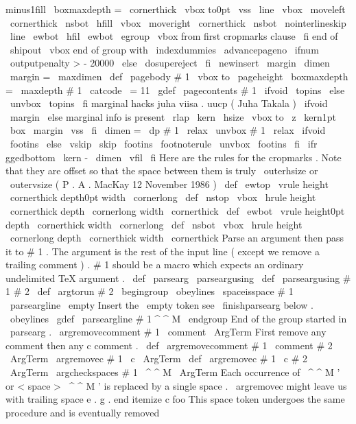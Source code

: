 {{{{minus1fill
\
boxmaxdepth
=
\
cornerthick
\
vbox
to0pt
{
\
vss
\
line
{
%
\
vbox
{
\
moveleft
\
cornerthick
\
nsbot
}
%
\
hfill
\
vbox
{
\
moveright
\
cornerthick
\
nsbot
}
%
}
%
\
nointerlineskip
\
line
{
\
ewbot
\
hfil
\
ewbot
}
%
}
%
\
egroup
%
\
vbox
from
first
cropmarks
clause
\
fi
}
%
end
of
\
shipout
\
vbox
}
%
end
of
group
with
\
indexdummies
\
advancepageno
\
ifnum
\
outputpenalty
>
-
20000
\
else
\
dosupereject
\
fi
}
\
newinsert
\
margin
\
dimen
\
margin
=
\
maxdimen
\
def
\
pagebody
#
1
{
\
vbox
to
\
pageheight
{
\
boxmaxdepth
=
\
maxdepth
#
1
}
}
{
\
catcode
\
=
11
\
gdef
\
pagecontents
#
1
{
\
ifvoid
\
topins
\
else
\
unvbox
\
topins
\
fi
%
marginal
hacks
juha
viisa
.
uucp
(
Juha
Takala
)
\
ifvoid
\
margin
\
else
%
marginal
info
is
present
\
rlap
{
\
kern
\
hsize
\
vbox
to
\
z
{
\
kern1pt
\
box
\
margin
\
vss
}
}
\
fi
\
dimen
=
\
dp
#
1
\
relax
\
unvbox
#
1
\
relax
\
ifvoid
\
footins
\
else
\
vskip
\
skip
\
footins
\
footnoterule
\
unvbox
\
footins
\
fi
\
ifr
ggedbottom
\
kern
-
\
dimen
\
vfil
\
fi
}
}
%
Here
are
the
rules
for
the
cropmarks
.
Note
that
they
are
%
offset
so
that
the
space
between
them
is
truly
\
outerhsize
or
\
outervsize
%
(
P
.
A
.
MacKay
12
November
1986
)
%
\
def
\
ewtop
{
\
vrule
height
\
cornerthick
depth0pt
width
\
cornerlong
}
\
def
\
nstop
{
\
vbox
{
\
hrule
height
\
cornerthick
depth
\
cornerlong
width
\
cornerthick
}
}
\
def
\
ewbot
{
\
vrule
height0pt
depth
\
cornerthick
width
\
cornerlong
}
\
def
\
nsbot
{
\
vbox
{
\
hrule
height
\
cornerlong
depth
\
cornerthick
width
\
cornerthick
}
}
%
Parse
an
argument
then
pass
it
to
#
1
.
The
argument
is
the
rest
of
%
the
input
line
(
except
we
remove
a
trailing
comment
)
.
#
1
should
be
a
%
macro
which
expects
an
ordinary
undelimited
TeX
argument
.
%
\
def
\
parsearg
{
\
parseargusing
{
}
}
\
def
\
parseargusing
#
1
#
2
{
%
\
def
\
argtorun
{
#
2
}
%
\
begingroup
\
obeylines
\
spaceisspace
#
1
%
\
parseargline
\
empty
%
Insert
the
\
empty
token
see
\
finishparsearg
below
.
}
{
\
obeylines
%
\
gdef
\
parseargline
#
1
^
^
M
{
%
\
endgroup
%
End
of
the
group
started
in
\
parsearg
.
\
argremovecomment
#
1
\
comment
\
ArgTerm
%
}
%
}
%
First
remove
any
comment
then
any
c
comment
.
\
def
\
argremovecomment
#
1
\
comment
#
2
\
ArgTerm
{
\
argremovec
#
1
\
c
\
ArgTerm
}
\
def
\
argremovec
#
1
\
c
#
2
\
ArgTerm
{
\
argcheckspaces
#
1
\
^
^
M
\
ArgTerm
}
%
Each
occurrence
of
\
^
^
M
'
or
<
space
>
\
^
^
M
'
is
replaced
by
a
single
space
.
%
%
\
argremovec
might
leave
us
with
trailing
space
e
.
g
.
%
end
itemize
c
foo
%
This
space
token
undergoes
the
same
procedure
and
is
eventually
removed
}
